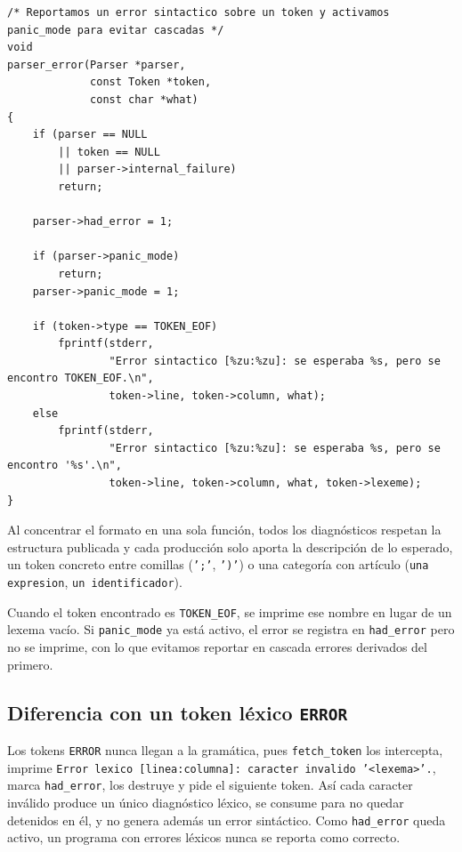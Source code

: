 \documentclass[12pt,letterpaper]{article}
\begin{document}
\begin{lstlisting}[style=modernc, caption={Función \texttt{parser\_error}.}]
/* Reportamos un error sintactico sobre un token y activamos panic_mode para evitar cascadas */
void
parser_error(Parser *parser,
             const Token *token,
             const char *what)
{
    if (parser == NULL
        || token == NULL
        || parser->internal_failure)
        return;

    parser->had_error = 1;

    if (parser->panic_mode)
        return;
    parser->panic_mode = 1;

    if (token->type == TOKEN_EOF)
        fprintf(stderr,
                "Error sintactico [%zu:%zu]: se esperaba %s, pero se encontro TOKEN_EOF.\n",
                token->line, token->column, what);
    else
        fprintf(stderr,
                "Error sintactico [%zu:%zu]: se esperaba %s, pero se encontro '%s'.\n",
                token->line, token->column, what, token->lexeme);
}
\end{lstlisting}

\bigskip

Al concentrar el formato en una sola función, todos los diagnósticos respetan la estructura publicada y cada
producción solo aporta la descripción de lo esperado, un token concreto entre comillas (\texttt{';'},
\texttt{')'}) o una categoría con artículo (\texttt{una expresion}, \texttt{un identificador}).

Cuando el token encontrado es \texttt{TOKEN\_EOF}, se imprime ese nombre en lugar de un lexema vacío. Si
\texttt{panic\_mode} ya está activo, el error se registra en \texttt{had\_error} pero no se imprime, con lo que
evitamos reportar en cascada errores derivados del primero.

\subsection*{Diferencia con un token léxico \texttt{ERROR}}

Los tokens \texttt{ERROR} nunca llegan a la gramática, pues \texttt{fetch\_token} los intercepta, imprime
\texttt{Error lexico [linea:columna]: caracter invalido '<lexema>'.}, marca \texttt{had\_error}, los destruye y
pide el siguiente token. Así cada caracter inválido produce un único diagnóstico léxico, se consume para no
quedar detenidos en él, y no genera además un error sintáctico. Como \texttt{had\_error} queda activo, un
programa con errores léxicos nunca se reporta como correcto.
\end{document}
